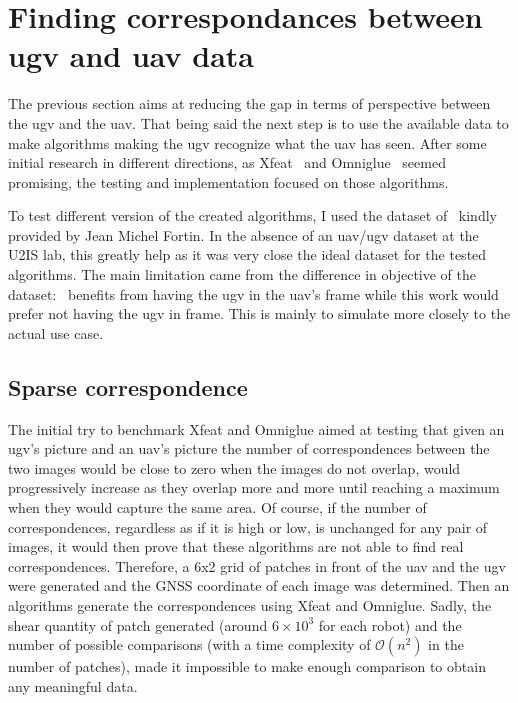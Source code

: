 \chapter{Finding correspondances between \gls{ugv} and \gls{uav} data}\label{ch:finding-correspondances-between-ugv-and-uav-data}

The previous section aims at reducing the gap in terms of perspective between the \gls{ugv} and the \gls{uav}.
That being said the next step is to use the available data to make algorithms making the \gls{ugv} recognize what the \gls{uav}
has seen.
After some initial research in different directions, as Xfeat~\parencite{potje_xfeat_2024} and Omniglue~\parencite{jiang_omniglue_2024}
seemed promising, the testing and implementation focused on those algorithms.

To test different version of the created algorithms, I used the dataset of~\cite{fortin_uav-assisted_2024} kindly provided by Jean Michel Fortin.
In the absence of an \gls{uav}/\gls{ugv} dataset at the U2IS lab, this greatly help as it was very close the ideal
dataset for the tested algorithms.
The main limitation came from the difference in objective of the dataset:~\cite{fortin_uav-assisted_2024} benefits from
having the \gls{ugv} in the \gls{uav}'s frame while this work would prefer not having the \gls{ugv} in frame.
This is mainly to simulate more closely to the actual use case.


\section{Sparse correspondence}

The initial try to benchmark Xfeat and Omniglue aimed at testing that given an \gls{ugv}'s picture and an \gls{uav}'s picture
the number of correspondences between the two images would be close to zero when the images do not overlap, would
progressively increase as they overlap more and more until reaching a maximum when they would capture the same area.
Of course, if the number of correspondences, regardless as if it is high or low, is unchanged for any pair of images,
it would then prove that these algorithms are not able to find real correspondences.
Therefore, a 6x2 grid of patches in front of the uav and the ugv were generated and the GNSS coordinate of each image was determined.
Then an algorithms generate the correspondences using Xfeat and Omniglue.
Sadly, the shear quantity of patch generated (around $6 \times 10^3$ for each robot) and the number of possible comparisons
(with a time complexity of $\mathcal{O}(n^2)$ in the number of patches), made it impossible to make enough comparison to
obtain any meaningful data.

